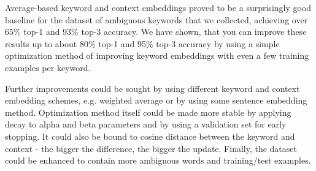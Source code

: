 \documentclass{llncs}
\begin{document}
Average-based keyword and context embeddings proved to be a surprisingly good baseline for the dataset of ambiguous keywords that we collected, achieving over 65\% top-1 and 93\% top-3 accuracy.
We have shown, that you can improve these results up to about 80\% top-1 and 95\% top-3 accuracy by using a simple optimization method of improving keyword embeddings with even a few training examples per keyword.

Further improvements could be sought by using different keyword and context embedding schemes, e.g. weighted average or by using some sentence embedding method. Optimization method itself could be made more stable by applying decay to alpha and beta parameters and by using a validation set for early stopping. It could also be bound to cosine distance between the keyword and context - the bigger the difference, the bigger the update. Finally, the dataset could be enhanced to contain more ambiguous words and training/test examples.



\end{document}
